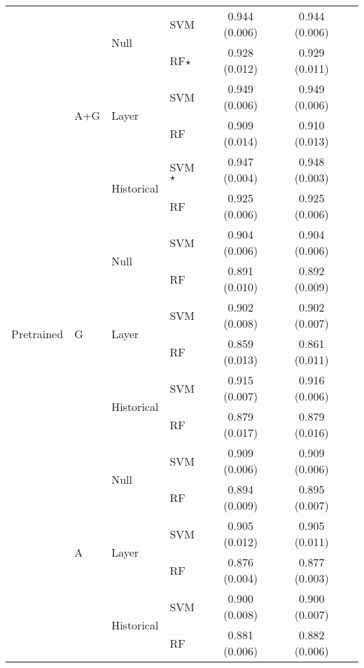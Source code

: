 \begin{table}[!t]
{\begin{tabular}{llllccc}
\midrule
\multirow{21}{*}{Pretrained} & \multirow{6}{*}{A+G} & \multirow{2}{*}{Null} & SVM & 0.944 (0.006) & 0.944 (0.006) \\
& & & RF$\star$ & 0.928 (0.012) & 0.929 (0.011) \\
\cmidrule(lr){3-6}
& & \multirow{2}{*}{Layer} & SVM & 0.949 (0.006) & 0.949 (0.006) \\
& & & RF & 0.909 (0.014) & 0.910 (0.013) \\
\cmidrule(lr){3-6}
& & \multirow{2}{*}{Historical} & SVM$\star$ & 0.947 (0.004) & 0.948 (0.003) \\
& & & RF & 0.925 (0.006) & 0.925 (0.006) \\
\cmidrule{2-6}
& \multirow{6}{*}{G} & \multirow{2}{*}{Null} & SVM & 0.904 (0.006) & 0.904 (0.006) \\
& & & RF & 0.891 (0.010) & 0.892 (0.009) \\
\cmidrule(lr){3-6}
& & \multirow{2}{*}{Layer} & SVM & 0.902 (0.008) & 0.902 (0.007) \\
& & & RF & 0.859 (0.013) & 0.861 (0.011) \\
\cmidrule(lr){3-6}
& & \multirow{2}{*}{Historical} & SVM & 0.915 (0.007) & 0.916 (0.006) \\
& & & RF & 0.879 (0.017) & 0.879 (0.016) \\
\cmidrule{2-6}
& \multirow{6}{*}{A} & \multirow{2}{*}{Null} & SVM & 0.909 (0.006) & 0.909 (0.006) \\
& & & RF & 0.894 (0.009) & 0.895 (0.007) \\
\cmidrule(lr){3-6}
& & \multirow{2}{*}{Layer} & SVM & 0.905 (0.012) & 0.905 (0.011) \\
& & & RF & 0.876 (0.004) & 0.877 (0.003) \\
\cmidrule(lr){3-6}
& & \multirow{2}{*}{Historical} & SVM & 0.900 (0.008) & 0.900 (0.007) \\
& & & RF & 0.881 (0.006) & 0.882 (0.006) \\
\bottomrule
\end{tabular}
}
\end{table}
